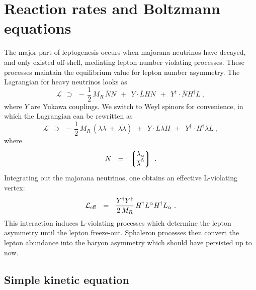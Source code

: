 \documentclass[12pt]{revtex4}
\newcommand{\ov}{\overline}
\begin{document}
	

%
%
\section{Reaction rates and Boltzmann equations}

	The major part of leptogenesis occurs when majorana neutrinos have decayed,
	and only existed off-shell, mediating lepton number violating processes.
	These processes maintain the equilibrium value for 
	lepton number asymmetry. 
	The Lagrangian for heavy neutrinos looks as
\begin{equation}
	\mathcal{L}  ~~\supset~~ -\,\frac 12\, M_R\, \ov{N}N ~~+~~
				Y\cdot \ov{L}HN ~~+~~  Y^\dagger\cdot \ov{N}H^\dagger L~,
\end{equation}
	where $ Y $ are Yukawa couplings.
	We switch to Weyl spinors for convenience, in which the Lagrangian can be rewritten as
\begin{equation}
	\mathcal{L}  ~~\supset~~ 
	-\,\frac 12\, M_R\, \left( \lambda\lambda ~+~ \ov{\lambda\lambda} \right) ~~+~~
				Y\cdot \ov{L\lambda}H ~~+~~  Y^\dagger\cdot H^\dagger \lambda L~,
\end{equation}
	where
\[	
	N  ~~=~~ \left\lgroup 
		\begin{matrix}
			\lambda_\alpha \\
			\ov{\lambda}^{\dot{\alpha}}
		\end{matrix}
		\right\rgroup~.
\]
	Integrating out the majorana neutrinos, one obtains an effective L-violating vertex:
\begin{equation}
\label{L_eff}
	\mathcal{L}_{\rm eff} ~~=~~ \frac{Y^\dag Y^\dag}{2\, M_R} \, H^\dag L^\alpha H^\dag L_\alpha~.
\end{equation}
	This interaction induces L-violating processes which determine the lepton asymmetry
	until the lepton freeze-out.
	Sphaleron processes then convert the lepton abundance into the baryon asymmetry which
	should have persisted up to now.

\subsection{Simple kinetic equation}
\end{document}
